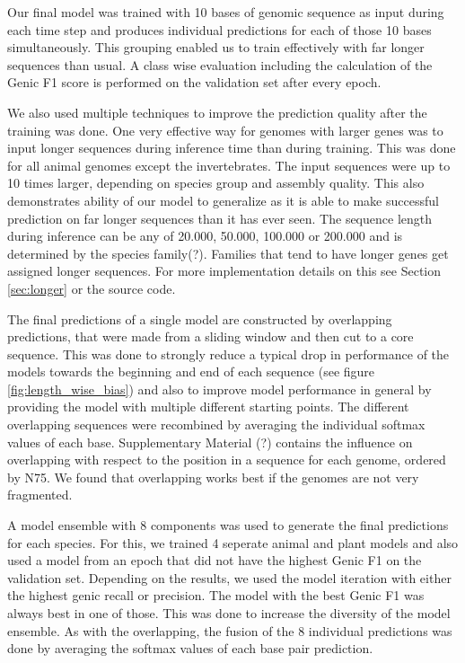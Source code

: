 \documentclass{bioinfo}
\begin{document}
\begin{methods}
Our final model was trained with 10 bases of genomic sequence as input during each time step and produces individual predictions for each of those 10 bases simultaneously. This grouping enabled us to train effectively with far longer sequences than usual. A class wise evaluation including the calculation of the Genic F1 score is performed on the validation set after every epoch.

We also used multiple techniques to improve the prediction quality after the training was done. One very effective way for genomes with larger genes was to input longer sequences during inference time than during training. This was done for all animal genomes except the invertebrates. The input sequences were up to 10 times larger, depending on species group and assembly quality. This also demonstrates ability of our model to generalize as it is able to make successful prediction on far longer sequences than it has ever seen. The sequence length during inference can be any of 20.000, 50.000, 100.000 or 200.000 and is determined by the species family(?). Families that tend to have longer genes get assigned longer sequences. For more implementation details on this see Section \ref{sec:longer} or the source code.
	
The final predictions of a single model are constructed by overlapping predictions, that were made from a sliding window and then cut to a core sequence. This was done to strongly reduce a typical drop in performance of the models towards the beginning and end of each sequence (see figure \ref{fig:length_wise_bias}) and also to improve model performance in general by providing the model with multiple different starting points. The different overlapping sequences were recombined by averaging the individual softmax values of each base. Supplementary Material (?) contains the influence on overlapping with respect to the position in a sequence for each genome, ordered by N75. We found that overlapping works best if the genomes are not very fragmented.

A model ensemble with 8 components was used to generate the final predictions for each species. For this, we trained 4 seperate animal and plant models and also used a model from an epoch that did not have the highest Genic F1 on the validation set. Depending on the results, we used the model iteration with either the highest genic recall or precision. The model with the best Genic F1 was always best in one of those. This was done to increase the diversity of the model ensemble. As with the overlapping, the fusion of the 8 individual predictions was done by averaging the softmax values of each base pair prediction.


\end{methods}
\end{document}
